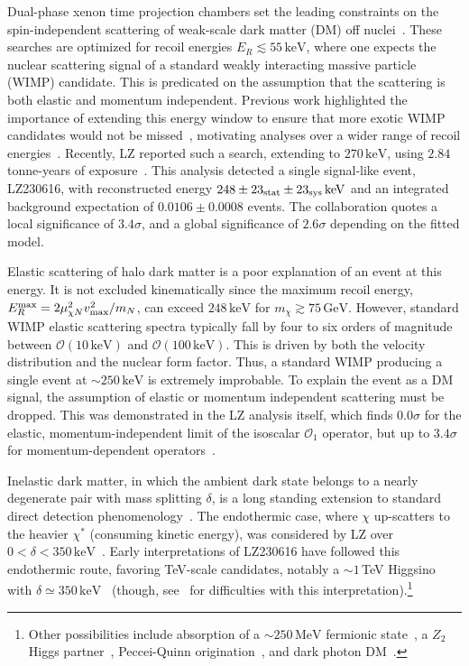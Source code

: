 \documentclass[aps,prl,twocolumn,superscriptaddress,nofootinbib,floatfix,longbibliography]{revtex4-2}
\newcommand{\keV}{\ensuremath{\,\mathrm{keV}}}
\newcommand{\MeV}{\ensuremath{\,\mathrm{MeV}}}
\newcommand{\GeV}{\ensuremath{\,\mathrm{GeV}}}
\newcommand{\ER}{\ensuremath{E_R}}
\newcommand{\mchi}{\ensuremath{m_\chi}}
\begin{document}
Dual-phase xenon time projection chambers set the leading constraints on the spin-independent scattering of weak-scale dark matter (DM) off nuclei~\cite{LZ:2024zvo,XENON:2025vwd,PandaX:2024qfu}. These searches are optimized for recoil energies $\ER \lesssim 55\keV$, where one expects the nuclear scattering signal of a standard weakly interacting massive particle (WIMP) candidate. This is predicated on the assumption that the scattering is both elastic and momentum independent. Previous work highlighted the importance of extending this energy window to ensure that more exotic WIMP candidates would not be missed~\cite{Bramante:2016rdh,Barello:2014uda}, motivating analyses over a wider range of recoil energies~\cite{LZ:2023lvz,PhysRevD.109.112017}. Recently, LZ reported such a search, extending to $270\keV$, using $2.84$ tonne-years of exposure~\cite{LZ:2026axp}. This analysis detected a single signal-like event, LZ230616, with reconstructed energy $248\pm23_{\rm stat}\pm23_{\rm sys}\keV$ and an integrated background expectation of $0.0106\pm0.0008$ events. The collaboration quotes a local significance of $3.4\sigma$, and a global significance of $2.6\sigma$ depending on the fitted model.

Elastic scattering of halo dark matter is a poor explanation of an event at this energy. It is not excluded kinematically since the maximum recoil energy, $\ER^{\rm max} = 2\mu_{\chi N}^2 v^2_{\rm max}/m_N$, can exceed $248\keV$ for $\mchi \gtrsim 75\GeV$. However, standard WIMP elastic scattering spectra typically fall by four to six orders of magnitude between $\mathcal{O}(10\keV)$ and $\mathcal{O}(100\keV)$. This is driven by both the velocity distribution and the nuclear form factor. Thus, a standard WIMP producing a single event at $\sim250\keV$ is extremely improbable. To explain the event as a DM signal, the assumption of elastic or momentum independent scattering must be dropped. This was demonstrated in the LZ analysis itself, which finds $0.0\sigma$ for the elastic, momentum-independent limit of the isoscalar $\mathcal{O}_1$ operator, but up to $3.4\sigma$ for momentum-dependent operators~\cite{LZ:2026axp}.

Inelastic dark matter, in which the ambient dark state belongs to a nearly degenerate pair with mass splitting $\delta$, is a long standing extension to standard direct detection phenomenology~\cite{Tucker-Smith:2001myb,Tucker-Smith:2004mxa,Graham:2010ca}. The endothermic case, where $\chi$ up-scatters to the heavier $\chi^*$ (consuming kinetic energy), was considered by LZ over $0 < \delta < 350\keV$~\cite{LZ:2026axp}. Early interpretations of LZ230616 have followed this endothermic route, favoring TeV-scale candidates, notably a $\sim1\,$TeV Higgsino with $\delta \simeq 350\keV$~\cite{Su:2026rwz,Freese:2026sga,Wu:2026nhi,DiMauro:2026ldr} (though, see~\cite{Pospelov:2026ewn} for difficulties with this interpretation).\footnote{Other possibilities include absorption of a $\sim250\MeV$ fermionic state~\cite{Lou:2026idn}, a $Z_2$ Higgs partner~\cite{Nomura:2026qyq}, Peccei-Quinn origination~\cite{Visinelli:2026kgt,Yin:2026jnn}, and dark photon DM~\cite{Yamashita:2026ump}.}  
\end{document}

